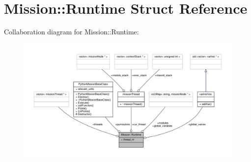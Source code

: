 \hypertarget{structMission_1_1Runtime}{}\section{Mission\+:\+:Runtime Struct Reference}
\label{structMission_1_1Runtime}


Collaboration diagram for Mission\+:\+:Runtime\+:
\nopagebreak
\begin{figure}[H]
\begin{center}
\leavevmode
\includegraphics[width=350pt]{dd/d32/structMission_1_1Runtime__coll__graph}
\end{center}
\end{figure}
